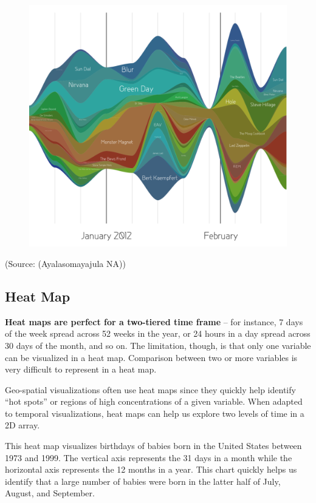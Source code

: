 \documentclass[]{book}
\begin{document}
\begin{figure}
\centering
\includegraphics{images/aya-stream.png}
\caption{}
\end{figure}

(Source: (Ayalasomayajula NA))

\subsection{Heat Map}\label{heat-map}

\textbf{Heat maps are perfect for a two-tiered time frame} -- for
instance, 7 days of the week spread across 52 weeks in the year, or 24
hours in a day spread across 30 days of the month, and so on. The
limitation, though, is that only one variable can be visualized in a
heat map. Comparison between two or more variables is very difficult to
represent in a heat map.

Geo-spatial visualizations often use heat maps since they quickly help
identify ``hot spots'' or regions of high concentrations of a given
variable. When adapted to temporal visualizations, heat maps can help us
explore two levels of time in a 2D array.

This heat map visualizes birthdays of babies born in the United States
between 1973 and 1999. The vertical axis represents the 31 days in a
month while the horizontal axis represents the 12 months in a year. This
chart quickly helps us identify that a large number of babies were born
in the latter half of July, August, and September.
\end{document}
